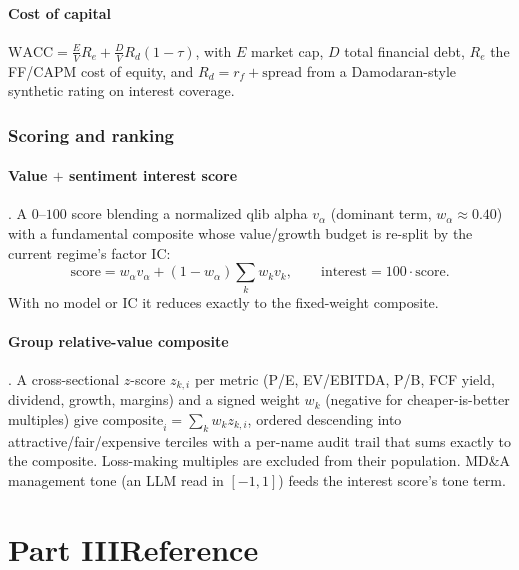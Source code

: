 \documentclass[11pt]{article}
\begin{document}
\subsection{Cost of capital}
\label{sec:wacc}
$\text{WACC}=\tfrac{E}{V}R_e+\tfrac{D}{V}R_d(1-\tau)$, with $E$ market cap, $D$ total
financial debt, $R_e$ the FF/CAPM cost of equity, and $R_d=r_f+\text{spread}$ from a
Damodaran-style synthetic rating on interest coverage.

\section{Scoring and ranking}
\subsection{Value $+$ sentiment interest score}
\label{sec:interest}
. A $0$--$100$ score blending a normalized qlib alpha
$v_\alpha$ (dominant term, $w_\alpha\approx0.40$) with a fundamental composite whose
value/growth budget is re-split by the current regime's factor IC:
\begin{equation}
  \text{score}=w_\alpha v_\alpha+(1-w_\alpha)\textstyle\sum_k w_k v_k,\qquad
  \text{interest}=100\cdot\text{score}.
\end{equation}
With no model or IC it reduces exactly to the fixed-weight composite.

\subsection{Group relative-value composite}
\label{sec:group}
. A cross-sectional $z$-score $z_{k,i}$ per metric (P/E,
EV/EBITDA, P/B, FCF yield, dividend, growth, margins) and a signed weight $w_k$
(negative for cheaper-is-better multiples) give
$\text{composite}_i=\sum_k w_k z_{k,i}$, ordered descending into
attractive/fair/expensive terciles with a per-name audit trail that sums exactly to
the composite. Loss-making multiples are excluded from their population. MD\&A
management tone (an LLM read in $[-1,1]$) feeds the interest score's tone term.

\clearpage
\part*{Part III\quad Reference}
\end{document}
